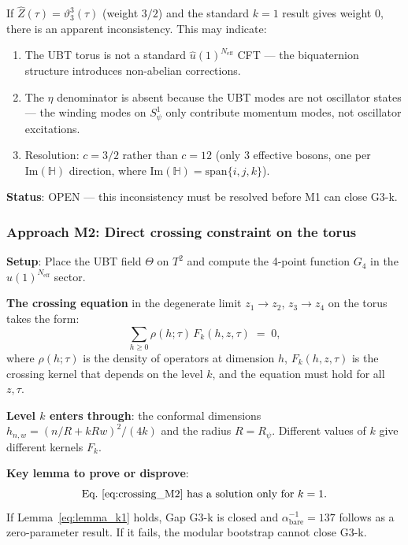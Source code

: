 \documentclass[12pt,a4paper]{article}
\theoremstyle{definition}
\theoremstyle{remark}
\newcommand{\vth}{\vartheta}
\begin{document}
\begin{tcolorbox}[colback=red!5!white,colframe=red!55!black,
  title={\textbf{M1 Assessment}: Modular Weight Inconsistency}]
If $\hat{Z}(\tau) = \vth_3^3(\tau)$ (weight $3/2$) and the standard $k=1$
result gives weight $0$, there is an apparent inconsistency.  This may indicate:
\begin{enumerate}
  \item The UBT torus is not a standard $\hat{u}(1)^{N_{\mathrm{eff}}}$ CFT
    — the biquaternion structure introduces non-abelian corrections.
  \item The $\eta$ denominator is absent because the UBT modes are not
    oscillator states — the winding modes on $S^1_\psi$ only contribute
    momentum modes, not oscillator excitations.
  \item Resolution: $c = 3/2$ rather than $c = 12$ (only 3 effective bosons,
    one per $\mathrm{Im}(\mathbb{H})$ direction, where $\mathrm{Im}(\mathbb{H}) = \mathrm{span}\{i,j,k\}$).
\end{enumerate}
\textbf{Status}: OPEN — this inconsistency must be resolved before M1 can close G3-k.
\end{tcolorbox}

\subsubsection*{Approach M2: Direct crossing constraint on the torus}

\textbf{Setup}: Place the UBT field $\Theta$ on $T^2$ and compute the 4-point
function $G_4$ in the $\hat{u}(1)^{N_{\mathrm{eff}}}$ sector.

\textbf{The crossing equation} in the degenerate limit $z_1 \to z_2$,
$z_3 \to z_4$ on the torus takes the form:
\begin{equation}
\label{eq:crossing_M2}
  \sum_{h \geq 0} \rho(h;\tau)\,F_k(h,z,\tau) \;=\; 0,
\end{equation}
where $\rho(h;\tau)$ is the density of operators at dimension $h$,
$F_k(h,z,\tau)$ is the crossing kernel that depends on the level $k$, and
the equation must hold for all $z, \tau$.

\textbf{Level $k$ enters through}: the conformal dimensions
$h_{n,w} = (n/R + kRw)^2/(4k)$ and the radius $R = R_\psi$.  Different
values of $k$ give different kernels $F_k$.

\textbf{Key lemma to prove or disprove}:
\begin{equation}
\label{eq:lemma_k1}
  \text{Eq.~\eqref{eq:crossing_M2} has a solution only for } k = 1.
\end{equation}
If Lemma~\eqref{eq:lemma_k1} holds, Gap G3-k is closed and
$\alpha^{-1}_{\mathrm{bare}} = 137$ follows as a zero-parameter result.
If it fails, the modular bootstrap cannot close G3-k.
\end{document}
